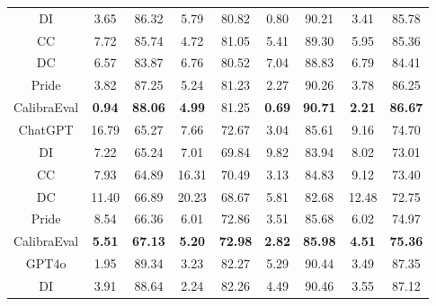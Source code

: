 \documentclass[sigconf]{acmart}
\begin{document}
\begin{table}[t]
\begin{tabular}{c|cc|cc|cc|cc}
DI                     & 3.65            & 86.32          & 5.79          & 80.82          & 0.80              & 90.21             & 3.41          & 85.78          \\
CC                     & 7.72            & 85.74          & 4.72          & 81.05          & 5.41              & 89.30             & 5.95          & 85.36          \\
DC                     & 6.57            & 83.87          & 6.76          & 80.52          & 7.04              & 88.83             & 6.79          & 84.41          \\
Pride                  & 3.82            & 87.25          & 5.24          & 81.23          & 2.27              & 90.26             & 3.78          & 86.25          \\
CalibraEval            & \textbf{0.94}   & \textbf{88.06} & \textbf{4.99} & 81.25          & \textbf{0.69}     & \textbf{90.71}    & \textbf{2.21} & \textbf{86.67} \\ \hline
ChatGPT                & 16.79           & 65.27          & 7.66          & 72.67          & 3.04              & 85.61             & 9.16          & 74.70          \\
DI                     & 7.22            & 65.24          & 7.01          & 69.84          & 9.82              & 83.94             & 8.02          & 73.01          \\
CC                     & 7.93            & 64.89          & 16.31         & 70.49          & 3.13              & 84.83             & 9.12          & 73.40          \\
DC                     & 11.40           & 66.89          & 20.23         & 68.67          & 5.81              & 82.68             & 12.48         & 72.75          \\
Pride                  & 8.54            & 66.36          & 6.01          & 72.86          & 3.51              & 85.68             & 6.02          & 74.97          \\
CalibraEval            & \textbf{5.51}   & \textbf{67.13} & \textbf{5.20} & \textbf{72.98} & \textbf{2.82}     & \textbf{85.98}    & \textbf{4.51} & \textbf{75.36} \\ \hline
GPT4o                  & 1.95            & 89.34          & 3.23          & 82.27          & 5.29              & 90.44             & 3.49          & 87.35          \\
DI                     & 3.91            & 88.64          & 2.24          & 82.26          & 4.49              & 90.46             & 3.55          & 87.12          \\

\end{tabular}
\end{table}
\end{document}

